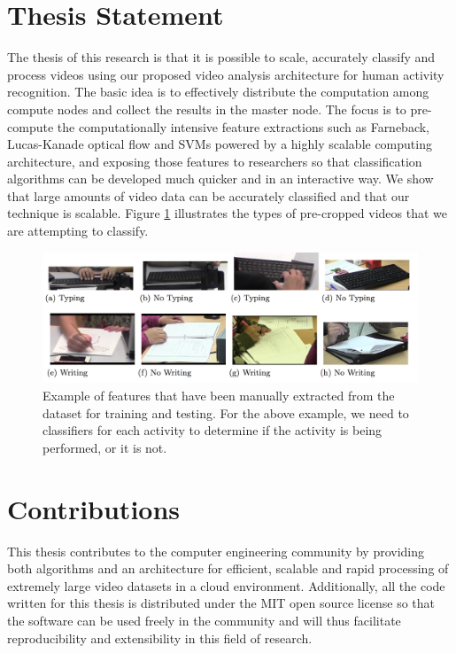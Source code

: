 \section{\label{section:thesis_statement}Thesis Statement} The thesis of this
research is that it is possible to scale, accurately classify and process videos
using our proposed video analysis architecture for human activity recognition.
The basic idea is to effectively distribute the computation among compute nodes
and collect the results in the master node. The focus is to pre-compute the
computationally intensive feature extractions such as Farneback, Lucas-Kanade
optical flow and SVMs powered by a highly scalable computing architecture, and
exposing those features to researchers so that classification algorithms can  be
developed much quicker and in an interactive way. We show that large amounts of
video data can be accurately classified and that our technique is scalable.
Figure \ref{fig:typing_writing} illustrates the types of pre-cropped videos that
we are attempting to classify.

\begin{figure}[h]
  \label{fig:typing_writing}
  \centering
  \includegraphics[width=\textwidth]{figures/typing_writing_clip}
  \caption{Example of features that have been manually extracted from the dataset
  for training and testing. For the above example, we need to classifiers for each
  activity to determine if the activity is being performed, or it is not.}
\end{figure}

\section{\label{section:contributions}Contributions}
This thesis contributes to the computer engineering community by providing both
algorithms and an architecture for efficient, scalable and rapid processing of
extremely large video datasets in a cloud environment. Additionally, all
the code written for this thesis is distributed under the MIT open source license
so that the software can be used freely in the community and will thus facilitate
reproducibility and extensibility in this field of research.

